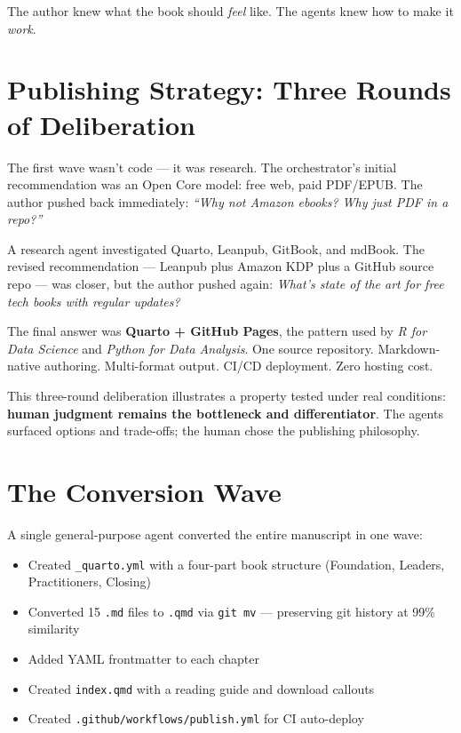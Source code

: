 \documentclass[
  a4paper,
  DIV=11,
  numbers=noendperiod]{scrreprt}
\providecommand{\tightlist}{%
  \setlength{\itemsep}{0pt}\setlength{\parskip}{0pt}}
\begin{document}
The author knew what the book should \emph{feel} like. The agents knew
how to make it \emph{work}.

\section{Publishing Strategy: Three Rounds of
Deliberation}\label{publishing-strategy-three-rounds-of-deliberation}

The first wave wasn't code --- it was research. The orchestrator's
initial recommendation was an Open Core model: free web, paid PDF/EPUB.
The author pushed back immediately: \emph{``Why not Amazon ebooks? Why
just PDF in a repo?''}

A research agent investigated Quarto, Leanpub, GitBook, and mdBook. The
revised recommendation --- Leanpub plus Amazon KDP plus a GitHub source
repo --- was closer, but the author pushed again: \emph{What's state of
the art for free tech books with regular updates?}

The final answer was \textbf{Quarto + GitHub Pages}, the pattern used by
\emph{R for Data Science} and \emph{Python for Data Analysis}. One
source repository. Markdown-native authoring. Multi-format output. CI/CD
deployment. Zero hosting cost.

This three-round deliberation illustrates a property tested under real
conditions: \textbf{human judgment remains the bottleneck and
differentiator}. The agents surfaced options and trade-offs; the human
chose the publishing philosophy.

\section{The Conversion Wave}\label{the-conversion-wave}

A single general-purpose agent converted the entire manuscript in one
wave:

\begin{itemize}
\tightlist
\item
  Created \texttt{\_quarto.yml} with a four-part book structure
  (Foundation, Leaders, Practitioners, Closing)
\item
  Converted 15 \texttt{.md} files to \texttt{.qmd} via \texttt{git\ mv}
  --- preserving git history at 99\% similarity
\item
  Added YAML frontmatter to each chapter
\item
  Created \texttt{index.qmd} with a reading guide and download callouts
\item
  Created \texttt{.github/workflows/publish.yml} for CI auto-deploy
\end{itemize}
\end{document}
